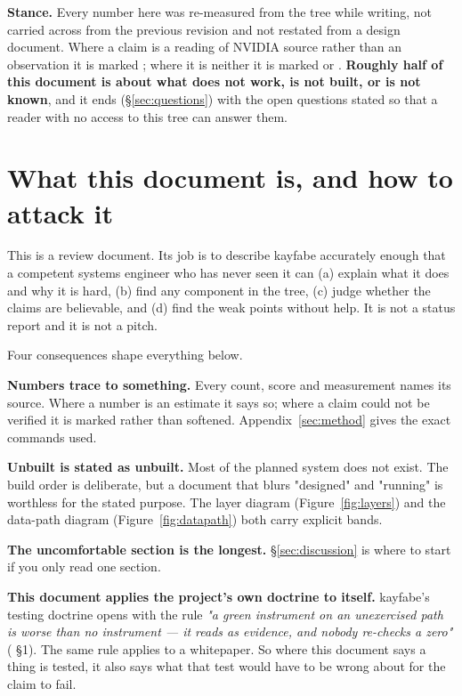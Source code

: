 \documentclass[10.5pt]{article}
\begin{document}
\begin{claimbox}
\smallskip
\textbf{Stance.} Every number here was re-measured from the tree while writing, not carried across
from the previous revision and not restated from a design document. Where a claim is a reading of
NVIDIA source rather than an observation it is marked \inferred{}; where it is neither it is marked
\assumed{} or \unver{}. \textbf{Roughly half of this document is about what does not work, is not
built, or is not known}, and it ends (\S\ref{sec:questions}) with the open questions stated so
that a reader with no access to this tree can answer them.
\end{claimbox}

\vspace{2mm}
{\small\tableofcontents}

\clearpage
{}

\section{What this document is, and how to attack it}

This is a review document. Its job is to describe kayfabe accurately enough that a competent
systems engineer who has never seen it can (a) explain what it does and why it is hard,
(b) find any component in the tree, (c) judge whether the claims are believable, and (d) find
the weak points without help. It is not a status report and it is not a pitch.

Four consequences shape everything below.

\textbf{Numbers trace to something.} Every count, score and measurement names its source.
Where a number is an estimate it says so; where a claim could not be verified it is marked
\unver{} rather than softened. Appendix~\ref{sec:method} gives the exact commands used.

\textbf{Unbuilt is stated as unbuilt.} Most of the planned system does not exist. The build
order is deliberate, but a document that blurs "designed" and "running" is worthless for the
stated purpose. The layer diagram (Figure~\ref{fig:layers}) and the data-path diagram
(Figure~\ref{fig:datapath}) both carry explicit \unbuilt{} bands.

\textbf{The uncomfortable section is the longest.} \S\ref{sec:discussion} is where to start if
you only read one section.

\textbf{This document applies the project's own doctrine to itself.} kayfabe's testing doctrine
opens with the rule \emph{"a green instrument on an unexercised path is worse than no
instrument — it reads as evidence, and nobody re-checks a zero"}
( \S1). The same rule applies to a whitepaper. So where
this document says a thing is tested, it also says what that test would have to be wrong about
for the claim to fail.
\end{document}

